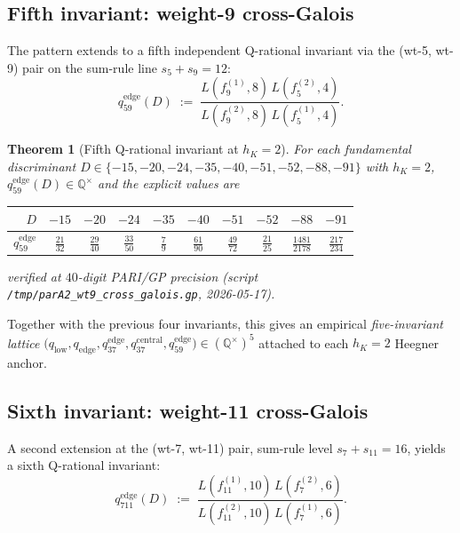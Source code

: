 \documentclass[11pt]{amsart}
\newtheorem{theorem}{Theorem}
\theoremstyle{definition}
\theoremstyle{remark}
\newcommand{\Q}{\mathbb{Q}}
\begin{document}
\subsection{Fifth invariant: weight-9 cross-Galois}\label{ss:wt9-extension}

The pattern extends to a fifth independent Q-rational invariant
via the (wt-5, wt-9) pair on the sum-rule line $s_5 + s_9 = 12$:
\begin{equation}\label{eq:q59-edge}
q_{59}^{\mathrm{edge}}(D) \;:=\;
\frac{L(f_9^{(1)}, 8)\,L(f_5^{(2)}, 4)}{L(f_9^{(2)}, 8)\,L(f_5^{(1)}, 4)}.
\end{equation}

\begin{theorem}[Fifth Q-rational invariant at $h_K = 2$]\label{thm:five-invariant}
For each fundamental discriminant $D \in \{-15, -20, -24, -35,
-40, -51, -52, -88, -91\}$ with $h_K = 2$,
$q_{59}^{\mathrm{edge}}(D) \in \Q^\times$ and the explicit values are
\begin{center}
\begin{tabular}{rccccccccc}
\toprule
$D$ & $-15$ & $-20$ & $-24$ & $-35$ & $-40$ & $-51$ & $-52$ & $-88$ & $-91$\\
\midrule
$q_{59}^{\mathrm{edge}}$
  & $\frac{21}{32}$ & $\frac{29}{40}$ & $\frac{33}{50}$ & $\frac{7}{9}$
  & $\frac{61}{90}$ & $\frac{49}{72}$ & $\frac{21}{25}$ & $\frac{1481}{2178}$ & $\frac{217}{234}$\\
\bottomrule
\end{tabular}
\end{center}
verified at $40$-digit PARI/GP precision (script
\verb|/tmp/parA2_wt9_cross_galois.gp|, 2026-05-17).
\end{theorem}

Together with the previous four invariants, this gives an empirical
\emph{five-invariant lattice}
$\bigl(q_{\mathrm{low}}, q_{\mathrm{edge}}, q_{37}^{\mathrm{edge}},
q_{37}^{\mathrm{central}}, q_{59}^{\mathrm{edge}}\bigr) \in (\Q^\times)^5$
attached to each $h_K=2$ Heegner anchor.

\subsection{Sixth invariant: weight-11 cross-Galois}\label{ss:wt11-extension}

A second extension at the (wt-7, wt-11) pair, sum-rule level
$s_7 + s_{11} = 16$, yields a sixth Q-rational invariant:
\begin{equation}\label{eq:q711-edge}
q_{711}^{\mathrm{edge}}(D) \;:=\;
\frac{L(f_{11}^{(1)}, 10)\,L(f_7^{(2)}, 6)}{L(f_{11}^{(2)}, 10)\,L(f_7^{(1)}, 6)}.
\end{equation}
\end{document}

